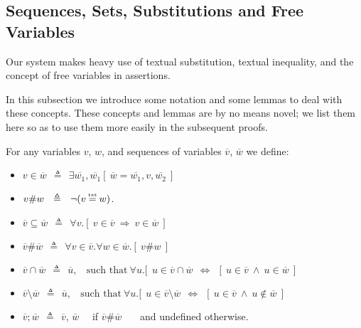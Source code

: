 \subsection{Sequences, Sets, Substitutions and Free Variables}


Our system makes heavy use of textual substitution,   textual inequality, and the concept of free variables in assertions. 
 
In this subsection we introduce some notation and some lemmas to deal with these concepts.
These concepts and lemmas are by no means novel; we list them here so as to use them more easily in the subsequent proofs.


\begin{definition}
For any variables $v$, $w$, and sequences of variables $\overline v$, $\overline w$ we define:
\begin{itemize}
\item
 $v \in \overline w \ \ \triangleq \ \  \exists  \overline {w_1},  \overline {w_1}[\  {\overline w} = \overline {w_1}, v, \overline {w_2} \ ]$
\item
$v \# w \ \ \triangleq \ \ \neg(v \txteq w)$.
\item
$\overline v \subseteq \overline w \ \ \triangleq \ \ \forall v.[\ v \in  \overline v\ \Rightarrow\ v \in  \overline w\ ]$
\item
$\overline v \#  \overline w \ \ \triangleq \ \ \forall v \in  \overline v. \forall w \in  \overline w.  [ \ v \# w\  ]$
\item
$ \overline v \cap \overline w \ \ \triangleq \ \  \overline u, \ \ \ \ \mbox{such that}\   \forall u.[ \ \ u  \in   \overline v \cap \overline w \ \ \Leftrightarrow\ \  [ \ u\in \overline v\ \wedge\ u\in \overline w\  ]$
\item
$ \overline v \setminus \overline w \ \ \triangleq \ \  \overline u, \ \ \ \ \mbox{such that}\   \forall u.[ \ \ u  \in  \overline v \setminus \overline w \ \ \Leftrightarrow\ \  [ \ u\in \overline v\ \wedge\ u\notin \overline w\  ]$
\item
$\overline v; \overline w \ \ \triangleq \ \ \overline v$, $\overline w$ \ \ if $\overline v \#  \overline w $ \ \ \ and  undefined otherwise.
\end{itemize}
\end{definition}

